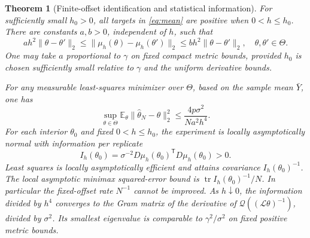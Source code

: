 \documentclass[11pt,reqno]{amsart}
\numberwithin{equation}{section}
\newtheorem{theorem}{Theorem}[section]
\theoremstyle{definition}\newtheorem{definition}[theorem]{Definition}
\theoremstyle{remark}\newtheorem{remark}[theorem]{Remark}
\newcommand{\tr}{\operatorname{tr}}
\newcommand{\cL}{\mathcal L}
\begin{document}
\begin{theorem}[Finite-offset identification and statistical information]\label{thm:noise}
For sufficiently small $h_0>0$, all targets in \eqref{eq:mean} are positive when $0<h\le h_0$. There are constants $a,b>0$, independent of $h$, such that
\begin{equation}\label{eq:bilip}
 ah^2\|\theta-\theta'\|_2\le
 \|\mu_h(\theta)-\mu_h(\theta')\|_2
 \le bh^2\|\theta-\theta'\|_2,
 \quad\theta,\theta'\in\Theta.
\end{equation}
One may take $a$ proportional to $\gamma$ on fixed compact metric bounds, provided $h_0$ is chosen sufficiently small relative to $\gamma$ and the uniform derivative bounds.

For any measurable least-squares minimizer over $\Theta$, based on the sample mean $\bar Y$, one has
\begin{equation}\label{eq:riskupper}
 \sup_{\theta\in\Theta}\mathbb E_\theta\|\widehat\theta_N-\theta\|_2^2
 \le \frac{4p\sigma^2}{Na^2h^4}.
\end{equation}
For each interior $\theta_0$ and fixed $0<h\le h_0$, the experiment is locally asymptotically normal with information per replicate
\begin{equation}\label{eq:fish}
 I_h(\theta_0)=\sigma^{-2}D\mu_h(\theta_0)^{\mathsf T}D\mu_h(\theta_0)>0.
\end{equation}
Least squares is locally asymptotically efficient and attains covariance $I_h(\theta_0)^{-1}$. The local asymptotic minimax squared-error bound is $\tr I_h(\theta_0)^{-1}/N$. In particular the fixed-offset rate $N^{-1}$ cannot be improved. As $h\downarrow0$, the information divided by $h^4$ converges to the Gram matrix of the derivative of $\mathcal Q((\cL\theta)^{-1})$, divided by $\sigma^2$. Its smallest eigenvalue is comparable to $\gamma^2/\sigma^2$ on fixed positive metric bounds.
\end{theorem}
\end{document}
